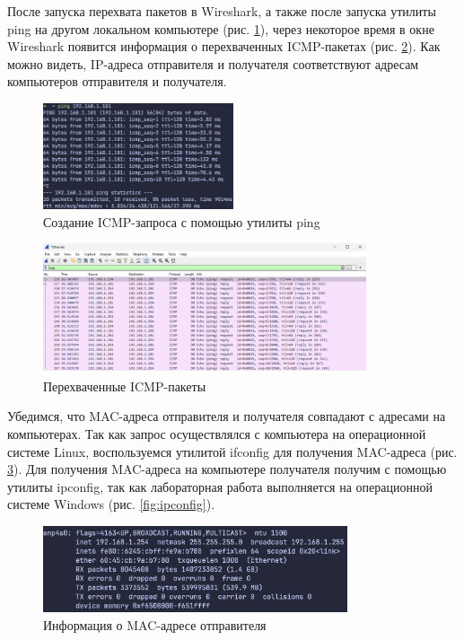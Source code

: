\documentclass[a4paper, 14pt]{extarticle}
\begin{document}
После запуска перехвата пакетов в Wireshark, а также после запуска утилиты ping
на другом локальном компьютере (рис. \ref{fig:ping}), через некоторое время в
окне Wireshark появится информация о перехваченных ICMP-пакетах (рис.
\ref{fig:icmp-result}). Как можно видеть, IP-адреса отправителя и получателя
соответствуют адресам компьютеров отправителя и получателя.

\begin{figure}[H]
  \centering
  \includegraphics[width=0.5\textwidth]{images/ping.png}
  \caption{Создание ICMP-запроса с помощью утилиты ping}
  \label{fig:ping}
\end{figure}

\begin{figure}[H]
  \centering
  \includegraphics[width=0.85\textwidth]{images/icmp-result.png}
  \caption{Перехваченные ICMP-пакеты}
  \label{fig:icmp-result}
\end{figure}

Убедимся, что MAC-адреса отправителя и получателя совпадают с адресами на
компьютерах. Так как запрос осуществлялся с компьютера на операционной системе
Linux, воспользуемся утилитой ifconfig для получения MAC-адреса (рис.
\ref{fig:ifconfig}). Для получения MAC-адреса на компьютере получателя получим с
помощью утилиты ipconfig, так как лабораторная работа выполняется на
операционной системе Windows (рис. \ref{fig:ipconfig}).

\begin{figure}[H]
  \centering
  \includegraphics[width=0.8\textwidth]{images/ifconfig.png}
  \caption{Информация о MAC-адресе отправителя}
  \label{fig:ifconfig}
\end{figure}
\end{document}
